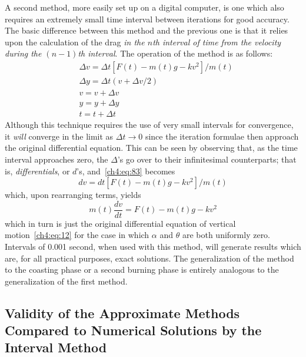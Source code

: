 A second method, more easily set up on a digital computer, is one which also requires an extremely small
time interval between iterations for good accuracy. The basic difference between this method and the
previous one is that it relies upon the calculation of the drag \emph{in the $n$th interval of time from the
velocity during the $(n-1)$th interval}. The operation of the method is as follows:
\begin{align}
&\Delta v = \Delta t[F(t) - m(t)g - kv^{2}]/m(t) \label{ch4:eq:83}\\
&\Delta y = \Delta t(v + \Delta v/2) \label{ch4:eq:84}\\
&v = v + \Delta v \label{ch4:eq:85}\\
&y = y + \Delta y \label{ch4:eq:86}\\
&t = t + \Delta t \label{ch4:eq:87}
\end{align}
Although this technique requires the use of very small intervals for convergence, it \emph{will} converge in
the limit as $\Delta t \to 0$ since the iteration formulae then approach the original differential
equation. This can be seen by observing that, as the time interval approaches zero, the $\Delta$'s go over
to their infinitesimal counterparts; that is, \emph{differentials}, or $d$'s, and~\eqref{ch4:eq:83} becomes
\begin{equation}\label{ch4:eq:88}
dv = dt[F(t) - m(t)g - kv^{2}]/m(t)
\end{equation}
which, upon rearranging terms, yields
\begin{equation}\label{ch4:eq:89}
m(t)\frac{dv}{dt} = F(t) - m(t)g - kv^{2}
\end{equation}
which in turn is just the original differential equation of vertical motion~\eqref{ch4:eq:12} for the case
in which $\alpha$ and $\theta$ are both uniformly zero. Intervals of 0.001 second, when used with this
method, will generate results which are, for all practical purposes, exact solutions. The generalization of
the method to the coasting phase or a second burning phase is entirely analogous to the generalization of
the first method.

\subsection{Validity of the Approximate Methods Compared to Numerical Solutions by the Interval
Method}\label{ch4:sec:2.5}

